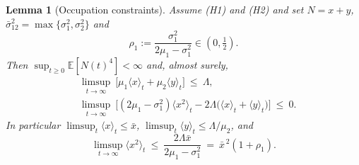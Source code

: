 \documentclass{article}
\newtheorem{lemma}{Lemma}[section]
\newcommand{\avg}[1]{\big\langle #1 \big\rangle_t}
\begin{document}
\begin{lemma}[Occupation constraints]\label{lem:occupation}
Assume (H1) and (H2) and set $N=x+y$, $\bar\sigma_{12}^2=\max\{\sigma_1^2,\sigma_2^2\}$ and
\begin{equation}\label{eq:rho1}
\rho_1:=\frac{\sigma_1^2}{2\mu_1-\sigma_1^2}\in(0,\tfrac12).
\end{equation}
Then $\sup_{t\ge0}\mathbb{E}[N(t)^4]<\infty$ and, almost surely,
\begin{align}
&\limsup_{t\to\infty}\ \big[\mu_1\avg{x}+\mu_2\avg{y}\big]\ \le\ \Lambda, \label{eq:occ1}\\[2pt]
&\limsup_{t\to\infty}\ \Big[(2\mu_1-\sigma_1^2)\avg{x^2}-2\Lambda\big(\avg{x}+\avg{y}\big)\Big]\ \le\ 0. \label{eq:occ2}
\end{align}
In particular $\limsup_t\avg{x}\le\bar x$, $\limsup_t\avg{y}\le\Lambda/\mu_2$, and
\begin{equation}\label{eq:secondmomentbound}
\limsup_{t\to\infty}\avg{x^2}\ \le\ \frac{2\Lambda\bar x}{2\mu_1-\sigma_1^2}\ =\ \bar x^{\,2}(1+\rho_1).
\end{equation}
\end{lemma}
\end{document}
